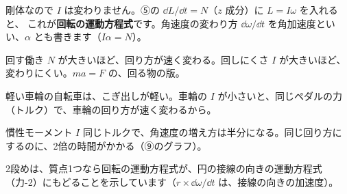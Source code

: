 剛体なので $I$ は変わりません。⑤の $\dd L/\dd t=N$（$z$ 成分）に $L=I\omega$ を入れると、\label{ph:力-6:undou}
これが\textbf{回転の運動方程式}です。角速度の変わり方 $\dd\omega/\dd t$ を角加速度といい、$\alpha$ とも書きます（$I\alpha=N$）。

\begin{phyomi}[$I\dfrac{\dd\omega}{\dd t}=N$]
回す働き $N$ が大きいほど、回り方が速く変わる。回しにくさ $I$ が大きいほど、変わりにくい。$ma=F$ の、回る物の版。
\end{phyomi}
\begin{phmijika}[自転車のこぎ出し]
軽い車輪の自転車は、こぎ出しが軽い。車輪の $I$ が小さいと、同じペダルの力（トルク）で、車輪の回り方が速く変わるから。
\end{phmijika}
\begin{phbaisuru}{慣性モーメント $I$}
同じトルクで、角速度の増え方は半分になる。同じ回り方にするのに、2倍の時間がかかる（⑨のグラフ）。
\end{phbaisuru}

\begin{phflow}[回転の運動方程式]
\end{phflow}
\noindent 2段めは、質点1つなら回転の運動方程式が、円の接線の向きの運動方程式（力-2）にもどることを示しています（$r\times\dd\omega/\dd t$ は、接線の向きの加速度）。

